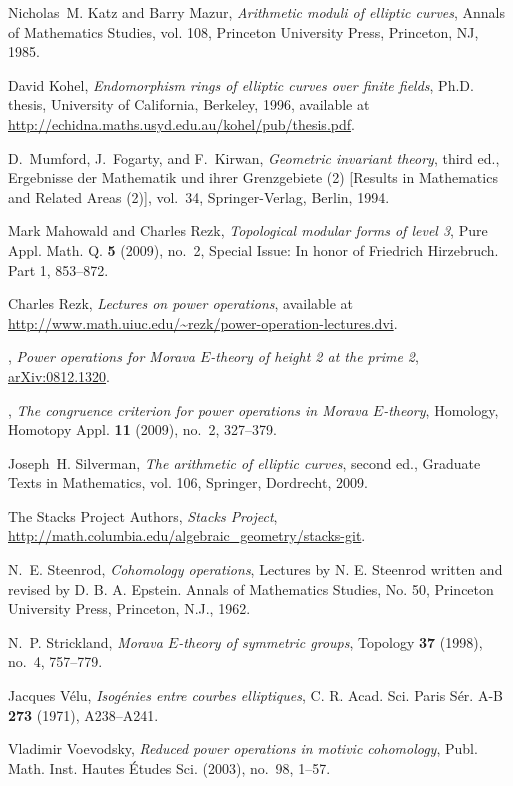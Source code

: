 \documentclass{gtpart}
\theoremstyle{definition}
\theoremstyle{remark}
\begin{document}
\begin{thebibliography}
Nicholas~M. Katz and Barry Mazur, \emph{Arithmetic moduli of elliptic curves},
  Annals of Mathematics Studies, vol. 108, Princeton University Press,
  Princeton, NJ, 1985. 

David Kohel, \emph{Endomorphism rings of elliptic curves over finite fields},
  Ph.D. thesis, University of California, Berkeley, 1996,
  available at \url{http://echidna.maths.usyd.edu.au/kohel/pub/thesis.pdf}.

D.~Mumford, J.~Fogarty, and F.~Kirwan, \emph{Geometric invariant theory}, third
  ed., Ergebnisse der Mathematik und ihrer Grenzgebiete (2) [Results in
  Mathematics and Related Areas (2)], vol.~34, Springer-Verlag, Berlin, 1994.

Mark Mahowald and Charles Rezk, \emph{Topological modular forms of level 3},
  Pure Appl. Math. Q. \textbf{5} (2009), no.~2, Special Issue: In honor of
  Friedrich Hirzebruch. Part 1, 853--872. 

Charles Rezk, \emph{Lectures on power operations},
  available at \url{http://www.math.uiuc.edu/~rezk/power-operation-lectures.dvi}.

\bysame, \emph{Power operations for {M}orava ${E}$-theory of height 2 at the
  prime 2}, \href{http://arxiv.org/abs/0812.1320}{arXiv:0812.1320}.

\bysame, \emph{The congruence criterion for power operations in {M}orava
  {$E$}-theory}, Homology, Homotopy Appl. \textbf{11} (2009), no.~2, 327--379.

Joseph~H. Silverman, \emph{The arithmetic of elliptic curves}, second ed.,
  Graduate Texts in Mathematics, vol. 106, Springer, Dordrecht, 2009.

The {Stacks Project Authors}, \emph{{\itshape Stacks Project}},
  \url{http://math.columbia.edu/algebraic_geometry/stacks-git}.

N.~E. Steenrod, \emph{Cohomology operations}, Lectures by N. E. Steenrod
  written and revised by D. B. A. Epstein. Annals of Mathematics Studies, No.
  50, Princeton University Press, Princeton, N.J., 1962. 

N.~P. Strickland, \emph{Morava {$E$}-theory of symmetric groups}, Topology
  \textbf{37} (1998), no.~4, 757--779. 

Jacques V{\'e}lu, \emph{Isog\'enies entre courbes elliptiques}, C. R. Acad.
  Sci. Paris S\'er. A-B \textbf{273} (1971), A238--A241. 

Vladimir Voevodsky, \emph{Reduced power operations in motivic cohomology},
  Publ. Math. Inst. Hautes \'Etudes Sci. (2003), no.~98, 1--57. 

\end{thebibliography}
\end{document}
